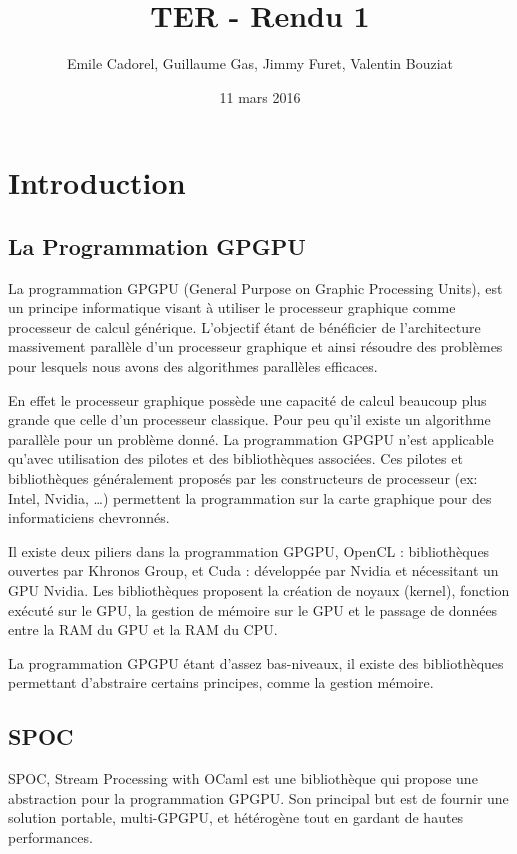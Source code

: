 \documentclass{report}
\title{TER - Rendu 1}
\author{Emile Cadorel, Guillaume Gas, Jimmy Furet, Valentin Bouziat}
\date{11 mars 2016}
\begin{document}
\maketitle

\chapter{Introduction}

\section{La Programmation GPGPU}
La programmation GPGPU\cite{refProgGPGPU} (General Purpose on Graphic Processing Units), est un principe informatique visant à utiliser le processeur graphique comme processeur de calcul générique. L’objectif étant de bénéficier de l’architecture massivement parallèle d’un processeur graphique et ainsi résoudre des problèmes pour lesquels nous avons des algorithmes parallèles efficaces.\newline

En effet le processeur graphique possède une capacité de calcul beaucoup plus grande que celle d’un processeur classique. Pour peu qu’il existe un algorithme parallèle pour un problème donné. La programmation GPGPU n’est applicable qu’avec utilisation des pilotes et des bibliothèques associées. Ces pilotes et bibliothèques généralement proposés par les constructeurs de processeur (ex: Intel, Nvidia, …) permettent la programmation sur la carte graphique pour des informaticiens chevronnés.\newline 

Il existe deux piliers dans la programmation GPGPU, OpenCL : bibliothèques ouvertes par Khronos Group, et Cuda : développée par Nvidia et nécessitant un GPU Nvidia.
Les bibliothèques proposent la création de noyaux  (kernel), fonction exécuté sur le GPU, la gestion de mémoire sur le GPU et le passage de données entre la RAM du GPU et la RAM du CPU.\newline

La programmation GPGPU étant d’assez bas-niveaux, il existe des bibliothèques permettant d’abstraire certains principes, comme la gestion mémoire. 

\section{SPOC}
SPOC\cite{refSpoc}, Stream Processing with OCaml est une bibliothèque qui propose une abstraction pour la programmation GPGPU. Son principal but est de fournir une solution portable, multi-GPGPU, et hétérogène tout en gardant de hautes performances.\newline
\end{document}

